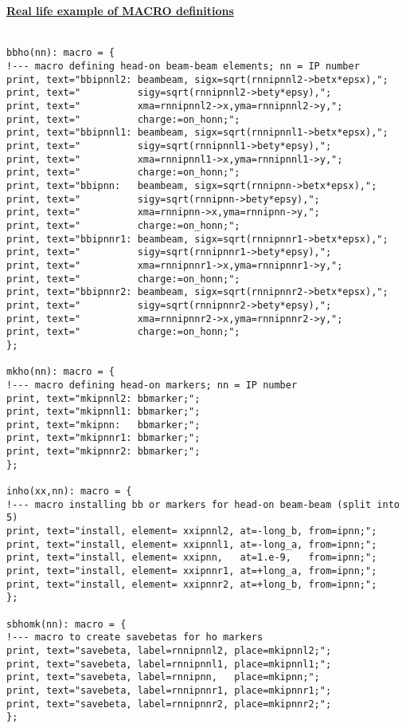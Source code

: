 \paragraph{\href{macro}{Real life example of MACRO definitions}}

\begin{verbatim}

bbho(nn): macro = {
!--- macro defining head-on beam-beam elements; nn = IP number
print, text="bbipnnl2: beambeam, sigx=sqrt(rnnipnnl2->betx*epsx),";
print, text="          sigy=sqrt(rnnipnnl2->bety*epsy),";
print, text="          xma=rnnipnnl2->x,yma=rnnipnnl2->y,";
print, text="          charge:=on_honn;";
print, text="bbipnnl1: beambeam, sigx=sqrt(rnnipnnl1->betx*epsx),";
print, text="          sigy=sqrt(rnnipnnl1->bety*epsy),";
print, text="          xma=rnnipnnl1->x,yma=rnnipnnl1->y,";
print, text="          charge:=on_honn;";
print, text="bbipnn:   beambeam, sigx=sqrt(rnnipnn->betx*epsx),";
print, text="          sigy=sqrt(rnnipnn->bety*epsy),";
print, text="          xma=rnnipnn->x,yma=rnnipnn->y,";
print, text="          charge:=on_honn;";
print, text="bbipnnr1: beambeam, sigx=sqrt(rnnipnnr1->betx*epsx),";
print, text="          sigy=sqrt(rnnipnnr1->bety*epsy),";
print, text="          xma=rnnipnnr1->x,yma=rnnipnnr1->y,";
print, text="          charge:=on_honn;";
print, text="bbipnnr2: beambeam, sigx=sqrt(rnnipnnr2->betx*epsx),";
print, text="          sigy=sqrt(rnnipnnr2->bety*epsy),";
print, text="          xma=rnnipnnr2->x,yma=rnnipnnr2->y,";
print, text="          charge:=on_honn;";
};

mkho(nn): macro = {
!--- macro defining head-on markers; nn = IP number
print, text="mkipnnl2: bbmarker;";
print, text="mkipnnl1: bbmarker;";
print, text="mkipnn:   bbmarker;";
print, text="mkipnnr1: bbmarker;";
print, text="mkipnnr2: bbmarker;";
};

inho(xx,nn): macro = {
!--- macro installing bb or markers for head-on beam-beam (split into 5)
print, text="install, element= xxipnnl2, at=-long_b, from=ipnn;";
print, text="install, element= xxipnnl1, at=-long_a, from=ipnn;";
print, text="install, element= xxipnn,   at=1.e-9,   from=ipnn;";
print, text="install, element= xxipnnr1, at=+long_a, from=ipnn;"; 
print, text="install, element= xxipnnr2, at=+long_b, from=ipnn;"; 
};

sbhomk(nn): macro = {
!--- macro to create savebetas for ho markers
print, text="savebeta, label=rnnipnnl2, place=mkipnnl2;";
print, text="savebeta, label=rnnipnnl1, place=mkipnnl1;";
print, text="savebeta, label=rnnipnn,   place=mkipnn;";
print, text="savebeta, label=rnnipnnr1, place=mkipnnr1;";
print, text="savebeta, label=rnnipnnr2, place=mkipnnr2;";    
};


\end{verbatim}
